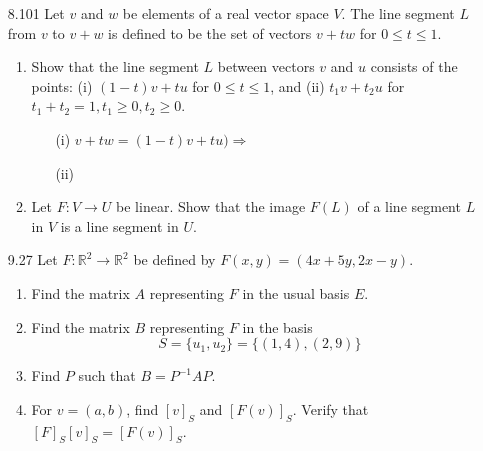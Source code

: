 \documentclass[12pt]{article}
\theoremstyle{definition}
\theoremstyle{plain}
\begin{document}
\begin{enumerate}
\item[8.101] Let $v$ and $w$ be elements of a real vector space $V$. The line segment $L$ from $v$ to $v+w$ is defined to be the set of vectors $v+tw$ for $0\leq t \leq 1$.
	\begin{enumerate}
	\item Show that the line segment $L$ between vectors $v$ and $u$ consists of the points: (i) $(1-t)v+tu$ for $0 \leq t \leq 1$, and (ii) $t_1v+t_2u$ for $t_1+t_2=1, t_1\geq 0, t_2\geq 0$.
		\begin{enumerate}
		\item[(i)] $v+tw = (1-t)v+tu) \Rightarrow $
		\item[(ii)]
		\end{enumerate}
	\item Let $F:V\rightarrow U$ be linear. Show that the image $F(L)$ of a line segment $L$ in $V$ is a line segment in $U$.
	\end{enumerate}

\item[9.27] Let $F:\mathbb{R}^2\rightarrow\mathbb{R}^2$ be defined by $F(x,y)=(4x+5y,2x-y)$.
	\begin{enumerate}
	\item Find the matrix $A$ representing $F$ in the usual basis $E$.
	\item Find the matrix $B$ representing $F$ in the basis
		\[ S=\{u_1,u_2\}=\{(1,4),(2,9)\} \]
	\item Find $P$ such that $B=P^{-1}AP$.
	\item For $v=(a,b)$, find $[v]_S$ and $[F(v)]_S$. Verify that $[F]_S[v]_S=[F(v)]_S$.
	\end{enumerate}
	
	
	
	
\end{enumerate}
\end{document}
